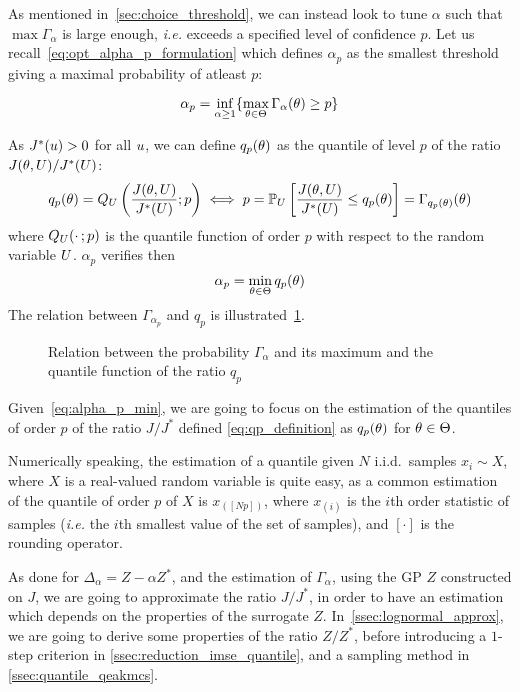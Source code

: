 \documentclass[../../Main_ManuscritThese.tex]{subfiles}
\newcommand\imgpath{/home/victor/acadwriting/Manuscrit/Text/Chapter4/img/}
\begin{document}
As mentioned in~\cref{sec:choice_threshold}, we can instead look to tune
$\alpha$ such that $\max \Gamma_{\alpha}$ is large enough, \emph{i.e.}
exceeds a specified level of confidence
$p$. %
Let us recall~\cref{eq:opt_alpha_p_formulation} which defines
$\alpha_p$ as the smallest threshold giving a maximal probability of
atleast $p$:

\begin{equation}
  \label{eq:alpha_p_inf_formation}
  \alpha_p = \inf_{\alpha \geq 1}\{\max_{\theta \in \Theta}\Gamma_{\alpha}(\theta)\geq p \}
\end{equation}

As $J^*(u) > 0$ for all $u$, we can define $q_{p}(\theta)$ as the quantile of level $p$ of the ratio $J(\theta, U) / J^*(U)$:
\begin{align}
  \label{eq:qp_definition}
       q_{p}(\theta)= Q_{U}\left(\frac{J(\theta, U)}{J^*(U)};p\right) \iff  p  = \mathbb{P}_{U}\left[\frac{J(\theta, U)}{J^*(U)} \leq q_{p}(\theta)\right] = \Gamma_{q_p(\theta)}(\theta)
\end{align}
where $Q_{U}(\cdot\,;p)$ is the quantile function of order $p$ with respect to the random variable $U$.
$\alpha_p$ verifies then
\begin{equation}
  \label{eq:alpha_p_min}
\alpha_p = \min_{\theta\in\Theta} q_p(\theta)
\end{equation}
The relation between $\Gamma_{\alpha_p}$ and $q_p$ is illustrated~\cref{fig:q_p_illu}.
\begin{figure}[ht]
  \centering
  
  \caption[Relation between $\Gamma_{\alpha}$ and $q_p$]{\label{fig:q_p_illu} Relation between the probability
    $\Gamma_{\alpha}$ and its maximum and the quantile function of the
    ratio $q_p$}
\end{figure}

Given~\cref{eq:alpha_p_min}, we are going to focus on the estimation
of the quantiles of order $p$ of the ratio $J/J^*$
defined \cref{eq:qp_definition} as $q_p(\theta)$ for $\theta \in \Theta$.

Numerically speaking, the estimation of a quantile given $N$ i.i.d.\
samples $x_i \sim X$, where $X$ is a real-valued random variable is
quite easy, as a common estimation of the quantile of order $p$ of $X$ is
$x_{(\left[Np\right])}$, where $x_{(i)}$ is the $i$th order statistic
of samples (\emph{i.e.} the $i$th smallest value of the set of
samples), and $[\cdot]$ is the rounding operator.

As done for $\Delta_{\alpha} = Z - \alpha Z^*$, and the estimation of
$\Gamma_{\alpha}$, using the GP $Z$ constructed on $J$, we are going
to approximate the ratio $J/J^*$, in order to have an estimation which
depends on the properties of the surrogate $Z$.
In~\cref{ssec:lognormal_approx}, we are going to derive some
properties of the ratio $Z/Z^*$, before introducing a $1$-step
criterion in \cref{ssec:reduction_imse_quantile}, and a sampling
method in \cref{ssec:quantile_qeakmcs}.
\end{document}
